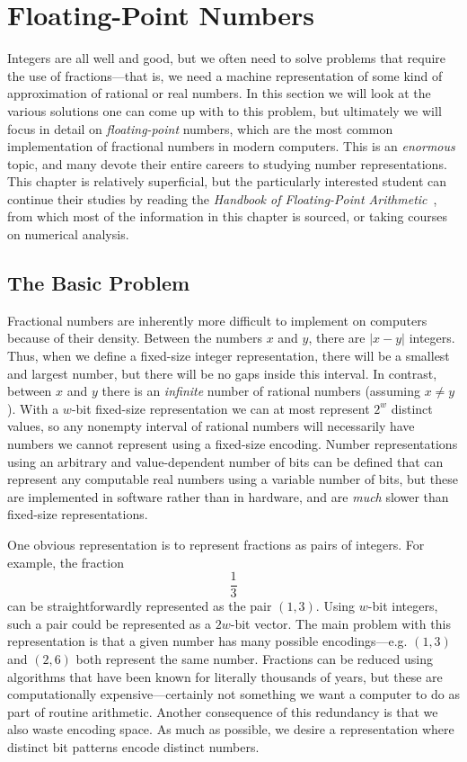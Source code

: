 \chapter{Floating-Point Numbers}
\label{sec:floats}

Integers are all well and good, but we often need to solve problems
that require the use of fractions---that is, we need a machine
representation of some kind of approximation of rational or real
numbers.  In this section we will look at the various solutions one
can come up with to this problem, but ultimately we will focus in
detail on \emph{floating-point} numbers, which are the most common
implementation of fractional numbers in modern computers.  This is an
\emph{enormous} topic, and many devote their entire careers to
studying number representations.  This chapter is relatively
superficial, but the particularly interested student can continue
their studies by reading the \emph{Handbook of Floating-Point
  Arithmetic}~\cite{muller2018handbook}, from which most of the
information in this chapter is sourced, or taking courses on numerical
analysis.

\section{The Basic Problem}

Fractional numbers are inherently more difficult to implement on
computers because of their density.  Between the numbers $x$ and $y$,
there are $|x-y|$ integers.  Thus, when we define a fixed-size integer
representation, there will be a smallest and largest number, but there
will be no gaps inside this interval.  In contrast, between $x$ and
$y$ there is an \emph{infinite} number of rational numbers (assuming
$x\neq y$).  With a $w$-bit fixed-size representation we can at most
represent $2^{w}$ distinct values, so any nonempty interval of
rational numbers will necessarily have numbers we cannot represent
using a fixed-size encoding.  Number representations using an
arbitrary and value-dependent number of bits can be defined that can
represent any computable real numbers using a variable number of bits,
but these are implemented in software rather than in hardware, and are
\emph{much} slower than fixed-size representations.

One obvious representation is to represent fractions as pairs of
integers.  For example, the fraction
\[
  \frac{1}{3}
\]
can be straightforwardly represented as the pair $(1,3)$.  Using
$w$-bit integers, such a pair could be represented as a $2w$-bit
vector.  The main problem with this representation is that a given
number has many possible encodings---e.g. $(1,3)$ and $(2,6)$ both
represent the same number.  Fractions can be reduced using algorithms
that have been known for literally thousands of years, but these are
computationally expensive---certainly not something we want a computer
to do as part of routine arithmetic.  Another consequence of this
redundancy is that we also waste encoding space.  As much as possible,
we desire a representation where distinct bit patterns encode distinct
numbers.

